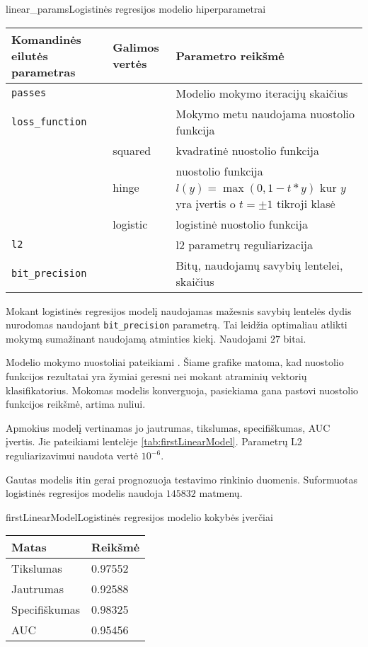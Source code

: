 \begin{ktutable}{linear_params}{Logistinės regresijos modelio hiperparametrai}
    \begin{tabular}{| l | l | p{7cm}|}
    \hline
        Komandinės eilutės parametras & Galimos vertės & Parametro reikšmė\\ \hline
        \texttt{passes} &  & Modelio mokymo iteracijų skaičius \\ \hline
        \texttt{loss\_function} &          & Mokymo metu naudojama nuostolio funkcija \\
                               & squared  & kvadratinė nuostolio funkcija  \\
                               & hinge    & nuostolio funkcija $l(y) = \max(0, 1 - t * y)$ kur $y$ yra įvertis o $t = \pm 1$ tikroji klasė  \\
                               & logistic & logistinė nuostolio funkcija \\ \hline
        \texttt{l2} & & l2 parametrų reguliarizacija \\ \hline
        \texttt{bit\_precision} & & Bitų, naudojamų savybių lentelei, skaičius\\ \hline
    \end{tabular}
\end{ktutable}

Mokant logistinės regresijos modelį naudojamas mažesnis savybių lentelės dydis nurodomas naudojant \texttt{bit\_precision}
 parametrą. Tai leidžia optimaliau atlikti mokymą sumažinant naudojamą atminties kiekį. Naudojami $27$ bitai.

Modelio mokymo nuostoliai pateikiami . Šiame grafike
matoma, kad nuostolio funkcijos rezultatai yra žymiai geresni nei mokant atraminių vektorių klasifikatorius. Mokomas modelis konverguoja, pasiekiama gana pastovi nuostolio funkcijos reikšmė, artima nuliui.


Apmokius modelį vertinamas jo jautrumas, tikslumas, specifiškumas, AUC įvertis. Jie pateikiami
lentelėje \vref{tab:firstLinearModel}. Parametrų L2 reguliarizavimui naudota vertė $10^{-6}$.

Gautas modelis itin gerai prognozuoja testavimo rinkinio duomenis. Suformuotas logistinės regresijos modelis naudoja
$145832$ matmenų.

\begin{ktutable}{firstLinearModel}{Logistinės regresijos modelio kokybės įverčiai}
    \begin{tabular}{| l | l |}
    \hline
       Matas & Reikšmė \\ \hline
               Tikslumas & 0.97552 \\ \hline
               Jautrumas & 0.92588 \\ \hline
               Specifiškumas & 0.98325 \\ \hline
               AUC & 0.95456 \\ \hline
    \end{tabular}
\end{ktutable}

